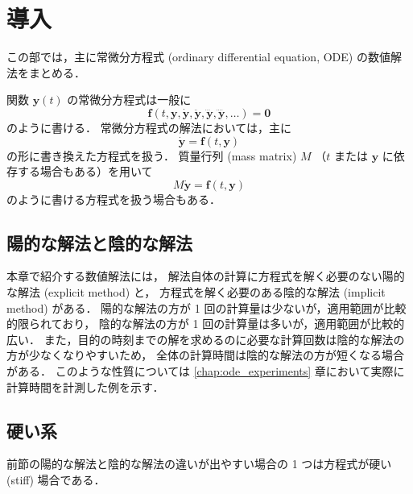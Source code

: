 %

\chapter{導入}

この部では，主に常微分方程式 (ordinary differential equation, ODE) の数値解法をまとめる．

関数 $\bm{y}(t)$ の常微分方程式は一般に
\begin{equation}
    \bm{f}(t, \bm{y}, \dot{\bm{y}}, \ddot{\bm{y}}, \dddot{\bm{y}}, \ddddot{\bm{y}}, \ldots) = \bm{0}
\end{equation}
のように書ける．
常微分方程式の解法においては，主に
\begin{equation}
    \dot{\bm{y}} = \bm{f}(t, \bm{y})
\end{equation}
の形に書き換えた方程式を扱う．
%
%
質量行列 (mass matrix) $M$ （$t$ または $\bm{y}$ に依存する場合もある）を用いて
\begin{equation}
    M \dot{\bm{y}} = \bm{f}(t, \bm{y})
\end{equation}
のように書ける方程式を扱う場合もある．

\section{陽的な解法と陰的な解法}

本章で紹介する数値解法には，
解法自体の計算に方程式を解く必要のない陽的な解法 (explicit method) と，
方程式を解く必要のある陰的な解法 (implicit method) がある．
陽的な解法の方が 1 回の計算量は少ないが，適用範囲が比較的限られており，
陰的な解法の方が 1 回の計算量は多いが，適用範囲が比較的広い．
また，目的の時刻までの解を求めるのに必要な計算回数は陰的な解法の方が少なくなりやすいため，
全体の計算時間は陰的な解法の方が短くなる場合がある．
このような性質については \ref{chap:ode_experiments} 章において実際に計算時間を計測した例を示す．

\section{硬い系}\label{sec:ode_intro_stiff}

%
%
前節の陽的な解法と陰的な解法の違いが出やすい場合の 1 つは方程式が硬い (stiff) 場合である．

